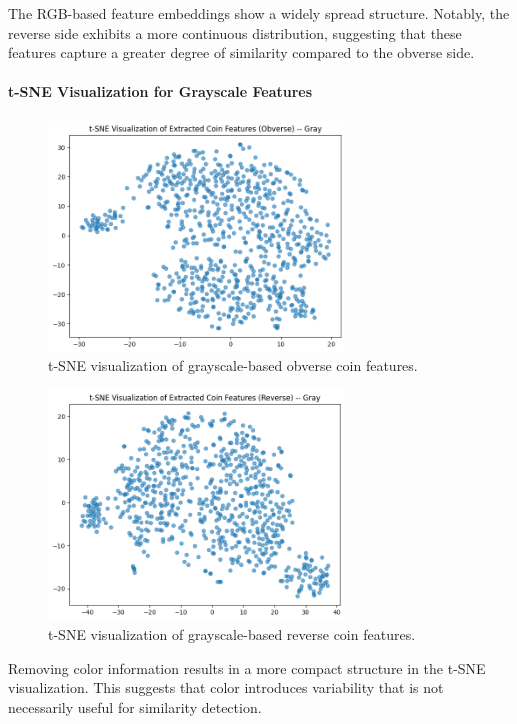 \documentclass[nolibertine, english, algorithm, nomencl, minted]{ttlab-qualify}
\begin{document}
The RGB-based feature embeddings show a widely spread structure. Notably, 
the reverse side exhibits a more continuous distribution, suggesting that these features capture 
a greater degree of similarity compared to the obverse side.

\paragraph{t-SNE Visualization for Grayscale Features}
\begin{figure}[H]
    \centering
    \includegraphics[width=0.7\textwidth]{static/tsne_ob_gray.png}
    \caption{t-SNE visualization of grayscale-based obverse coin features.}
    \label{fig:gray_obverse_tsne}
\end{figure}

\begin{figure}[H]
    \centering
    \includegraphics[width=0.7\textwidth]{static/tsne_rev_gray.png}
    \caption{t-SNE visualization of grayscale-based reverse coin features.}
    \label{fig:gray_reverse_tsne}
\end{figure}

Removing color information results in a more compact structure in the t-SNE visualization. 
This suggests that color introduces variability that is not necessarily useful for similarity detection.
\end{document}
